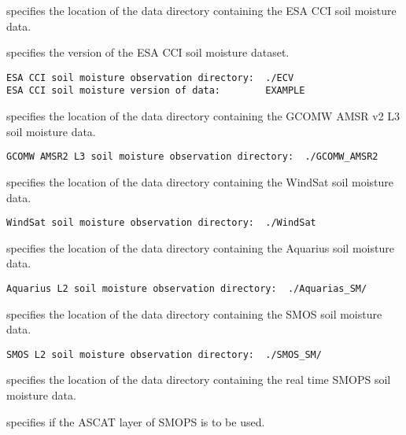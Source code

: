  
 specifies the location of the data directory containing the ESA CCI
 soil moisture data.

 specifies the version of the ESA CCI soil moisture dataset.
 

 \begin{Verbatim}[frame=single]
ESA CCI soil moisture observation directory:  ./ECV
ESA CCI soil moisture version of data:        EXAMPLE
 \end{Verbatim}

 
 specifies the location of the data directory containing the 
 GCOMW AMSR v2 L3 soil moisture data.
 

 \begin{Verbatim}[frame=single]
GCOMW AMSR2 L3 soil moisture observation directory:  ./GCOMW_AMSR2
 \end{Verbatim}

 
 specifies the location of the data directory containing the WindSat
 soil moisture data.
 

 \begin{Verbatim}[frame=single]
WindSat soil moisture observation directory:  ./WindSat
 \end{Verbatim}

 
 specifies the location of the data directory containing the Aquarius
 soil moisture data.
 

 \begin{Verbatim}[frame=single]
Aquarius L2 soil moisture observation directory:  ./Aquarias_SM/
 \end{Verbatim}

 
 specifies the location of the data directory containing the SMOS 
 soil moisture data.
 

 \begin{Verbatim}[frame=single]
SMOS L2 soil moisture observation directory:  ./SMOS_SM/
 \end{Verbatim}

 
 specifies the location of the data directory containing the real time
 SMOPS soil moisture data.

 specifies if the ASCAT layer of SMOPS is to be used.

